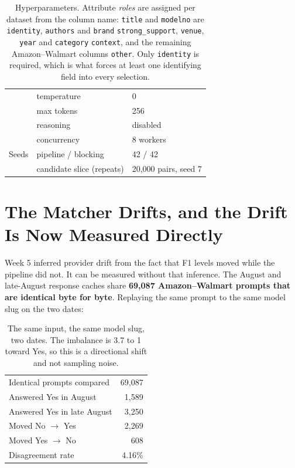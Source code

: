 \documentclass[11pt]{article}
\begin{document}
\begin{table}[H]
{\begin{tabular}{lll}
            & temperature                 & 0 \\
            & max tokens                  & 256 \\
            & reasoning                   & disabled \\
            & concurrency                 & 8 workers \\
\midrule
Seeds       & pipeline / blocking         & 42 / 42 \\
            & candidate slice (repeats)   & 20{,}000 pairs, seed 7 \\
\bottomrule
\end{tabular}}
\caption{Hyperparameters. Attribute \emph{roles} are assigned per dataset from the column
name: \texttt{title} and \texttt{modelno} are \texttt{identity}, \texttt{authors} and
\texttt{brand} \texttt{strong\_support}, \texttt{venue}, \texttt{year} and \texttt{category}
\texttt{context}, and the remaining Amazon--Walmart columns \texttt{other}. Only
\texttt{identity} is required, which is what forces at least one identifying field into every
selection.}
\end{table}

\section{The Matcher Drifts, and the Drift Is Now Measured Directly}
\label{sec:drift}

Week 5 inferred provider drift from the fact that F1 levels moved while the pipeline did not.
It can be measured without that inference. The August and late-August response caches share
\textbf{69{,}087 Amazon--Walmart prompts that are identical byte for byte}. Replaying the
same prompt to the same model slug on the two dates:

\begin{table}[H]
\centering
\begin{tabular}{lr}
\toprule
Identical prompts compared        & 69{,}087 \\
Answered Yes in August            & 1{,}589 \\
Answered Yes in late August       & 3{,}250 \\
Moved No $\rightarrow$ Yes        & 2{,}269 \\
Moved Yes $\rightarrow$ No        & 608 \\
Disagreement rate                 & 4.16\% \\
\bottomrule
\end{tabular}
\caption{The same input, the same model slug, two dates. The imbalance is 3.7 to 1 toward
Yes, so this is a directional shift and not sampling noise.}
\end{table}
\end{document}
